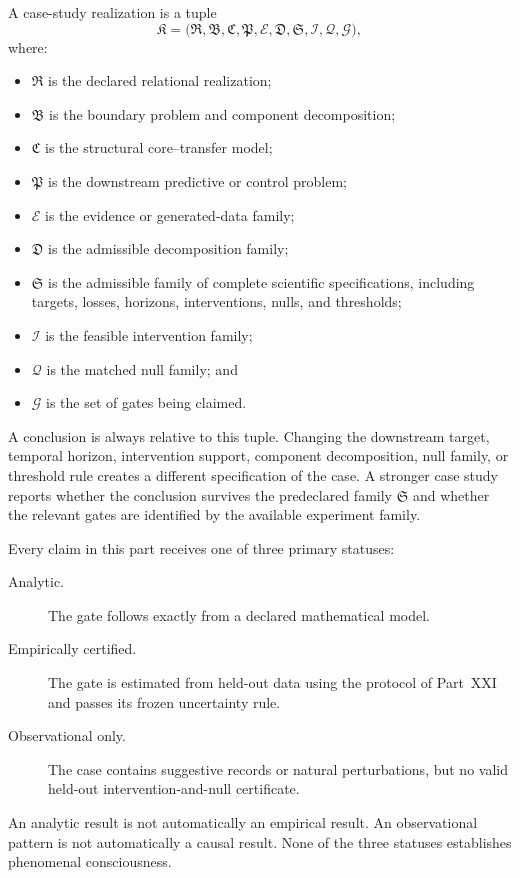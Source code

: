 \begin{definition}\label{def:case-study-realization}
A case-study realization is a tuple
\[
\mathfrak K
=
\bigl(
\mathfrak R,
\mathfrak B,
\mathfrak C,
\mathfrak P,
\mathcal E,
\mathfrak D,
\mathfrak S,
\mathcal I,
\mathcal Q,
\mathcal G
\bigr),
\]
where:
\begin{itemize}
\item \(\mathfrak R\) is the declared relational realization;
\item \(\mathfrak B\) is the boundary problem and component decomposition;
\item \(\mathfrak C\) is the structural core--transfer model;
\item \(\mathfrak P\) is the downstream predictive or control problem;
\item \(\mathcal E\) is the evidence or generated-data family;
\item \(\mathfrak D\) is the admissible decomposition family;
\item \(\mathfrak S\) is the admissible family of complete scientific
 specifications, including targets, losses, horizons, interventions, nulls,
 and thresholds;
\item \(\mathcal I\) is the feasible intervention family;
\item \(\mathcal Q\) is the matched null family; and
\item \(\mathcal G\) is the set of gates being claimed.
\end{itemize}
A conclusion is always relative to this tuple. Changing the downstream target,
temporal horizon, intervention support, component decomposition, null family,
or threshold rule creates a different specification of the case. A stronger
case study reports whether the conclusion survives the predeclared family
\(\mathfrak S\) and whether the relevant gates are identified by the available
experiment family.
\end{definition}


Every claim in this part receives one of three primary statuses:
\begin{description}
\item[Analytic.] The gate follows exactly from a declared mathematical model.
\item[Empirically certified.] The gate is estimated from held-out data using
 the protocol of Part~XXI and passes its frozen uncertainty rule.
\item[Observational only.] The case contains suggestive records or natural
 perturbations, but no valid held-out intervention-and-null certificate.
\end{description}
An analytic result is not automatically an empirical result. An observational
pattern is not automatically a causal result. None of the three statuses
establishes phenomenal consciousness.

